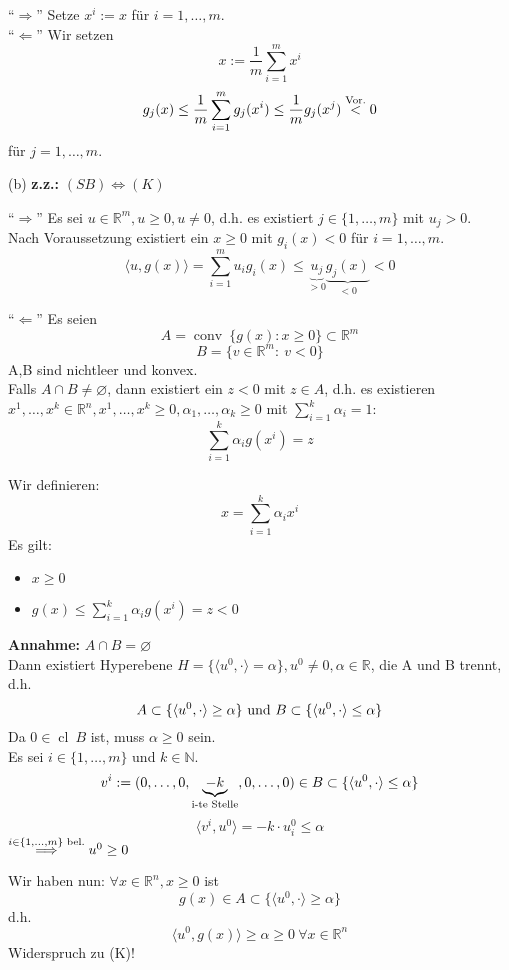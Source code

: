 \documentclass[a4paper,11pt,twoside,titlepage]{article}
\newcommand{\R}{{\mathbb R}}
\newcommand{\N}{{\mathbb N}}
\newcommand{\conv}{{\operatorname{conv}\:}}
\newcommand{\cl}{{\operatorname{cl}\:}}
\begin{document}
"`$\Rightarrow$"' Setze $x^i:=x$ für $i=1,\ldots,m$.\\
"`$\Leftarrow$"' Wir setzen 
\[x:=\frac 1m \sum_{i=1}^mx^i\]
\[g_j(x)\leq\frac 1m \sum_{i=1}^mg_j(x^i)\leq\frac 1mg_j(x^j)\stackrel{\textnormal{Vor.}}{<}0\]
für $j=1,\ldots,m$.

(b) \textbf{z.z.:} $(SB)\Leftrightarrow(K)$

"`$\Rightarrow$"' Es sei $u\in\R^m,u\ge0,u\neq0$, d.h. es existiert $j\in\{1,\ldots,m\}$ mit $u_j>0$.\\
Nach Voraussetzung existiert ein $x\ge0$ mit $g_i(x)<0$ für $i=1,\ldots,m$.
\[\langle u,g(x)\rangle =\sum_{i=1}^mu_ig_i(x)\leq \underbrace{u_j}_{>0}\underbrace{g_j(x)}_{<0}<0\]

"`$\Leftarrow$"' Es seien
\[A=\conv \{g(x): x\geq 0\}\subset\R^m\]
\[B=\{v\in\R^m:\ v<0\}\]
A,B sind nichtleer und konvex.\\
Falls $A\cap B\neq\varnothing$, dann existiert ein $z<0$ mit $z\in A$, d.h. es existieren $x^1,\ldots,x^k\in\R^n,x^1,\ldots,x^k\geq0,\alpha_1,\ldots,\alpha_k\geq0$ mit $\sum\limits_{i=1}^k\alpha_i=1$:
\[\sum_{i=1}^k\alpha_ig(x^i)=z\]

Wir definieren: 
\[x=\sum_{i=1}^k\alpha_ix^i\]
Es gilt:
\begin{itemize}
\item{$x\geq0$}
\item{$g(x)\leq \sum\limits_{i=1}^k\alpha_ig(x^i)=z<0$}
\end{itemize}

\textbf{Annahme:} $A\cap B=\varnothing$\\
Dann existiert Hyperebene $H=\{\langle u^0,\cdot\rangle=\alpha\},u^0\neq 0,\alpha\in\R$, die A und B trennt, d.h.
\[A\subset\{\langle u^0,\cdot\rangle\geq\alpha\}\textnormal{ und }B\subset\{\langle u^0,\cdot\rangle\leq\alpha\}\]
Da $0\in\cl B$ ist, muss $\alpha\geq 0$ sein.\\
Es sei $i\in\{1,\ldots,m\}$ und $k\in\N$.
\[v^i:=(0,\ldots,0,\underbrace{-k}_{\textnormal{i-te Stelle}},0,\ldots,0)\in B\subset\{\langle u^0,\cdot\rangle\leq\alpha\}\]
\[\langle v^i,u^0\rangle=-k\cdot u_i^0\leq\alpha\]
$\stackrel{i\in\{1,\ldots,m\}\textnormal{ bel.}}{\Longrightarrow} u^0\geq 0$

Wir haben nun: $\forall x\in\R^n,x\ge0$ ist
\[g(x)\in A\subset\{\langle u^0,\cdot\rangle\geq\alpha\}\]
d.h.
\[\langle u^0,g(x)\rangle\geq\alpha\geq0\ \forall x\in\R^n\]
Widerspruch zu (K)!
\end{document}
